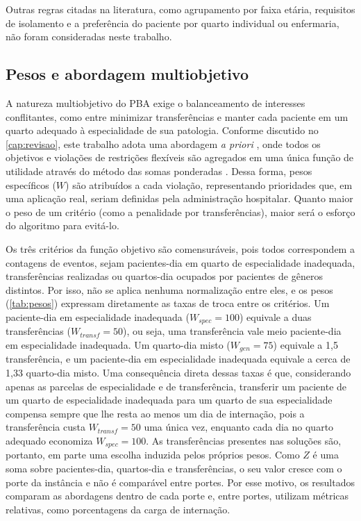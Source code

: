 Outras regras citadas na literatura, como agrupamento por faixa etária, requisitos de isolamento e a preferência do paciente por quarto individual ou enfermaria, não foram consideradas neste trabalho.


\subsection{Pesos e abordagem multiobjetivo}
\label{sec:pesos}

A natureza multiobjetivo do PBA exige o balanceamento de interesses conflitantes, como entre minimizar transferências e manter cada paciente em um quarto adequado à especialidade de sua patologia. Conforme discutido no \autoref{cap:revisao}, este trabalho adota uma abordagem \textit{a priori} \cite{talbi2009metaheuristics}, onde todos os objetivos e violações de restrições flexíveis são agregados em uma única função de utilidade através do método das somas ponderadas \cite{schafer2023combining, demeester2010hybrid}. Dessa forma, pesos específicos ($W$) são atribuídos a cada violação, representando prioridades que, em uma aplicação real, seriam definidas pela administração hospitalar. Quanto maior o peso de um critério (como a penalidade por transferências), maior será o esforço do algoritmo para evitá-lo.

Os três critérios da função objetivo são comensuráveis, pois todos correspondem a contagens de eventos, sejam pacientes-dia em quarto de especialidade inadequada, transferências realizadas ou quartos-dia ocupados por pacientes de gêneros distintos. Por isso, não se aplica nenhuma normalização entre eles, e os pesos (\autoref{tab:pesos}) expressam diretamente as taxas de troca entre os critérios. Um paciente-dia em especialidade inadequada ($W_{spec} = 100$) equivale a duas transferências ($W_{transf} = 50$), ou seja, uma transferência vale meio paciente-dia em especialidade inadequada. Um quarto-dia misto ($W_{gen} = 75$) equivale a 1,5 transferência, e um paciente-dia em especialidade inadequada equivale a cerca de 1,33 quarto-dia misto. Uma consequência direta dessas taxas é que, considerando apenas as parcelas de especialidade e de transferência, transferir um paciente de um quarto de especialidade inadequada para um quarto de sua especialidade compensa sempre que lhe resta ao menos um dia de internação, pois a transferência custa $W_{transf} = 50$ uma única vez, enquanto cada dia no quarto adequado economiza $W_{spec} = 100$. As transferências presentes nas soluções são, portanto, em parte uma escolha induzida pelos próprios pesos. Como $Z$ é uma soma sobre pacientes-dia, quartos-dia e transferências, o seu valor cresce com o porte da instância e não é comparável entre portes. Por esse motivo, os resultados comparam as abordagens dentro de cada porte e, entre portes, utilizam métricas relativas, como porcentagens da carga de internação.

